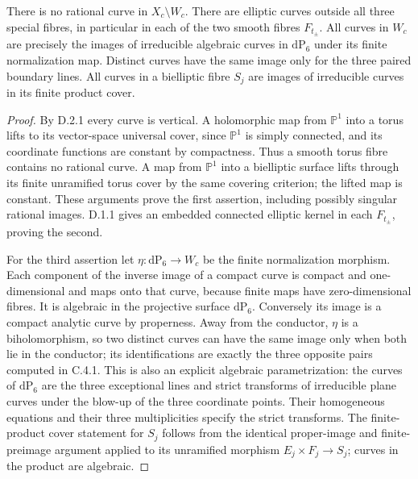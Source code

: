 \begin{proposition}\label{fam:src:D.2.2}\label{fam:st:D.2.2}
There is no rational curve in \(X_c\setminus W_c\). There are elliptic
curves outside all three special fibres, in particular in each of the
two smooth fibres \(F_{t_\pm}\). All curves in \(W_c\) are precisely the
images of irreducible algebraic curves in \(\mathrm{dP}_6\) under its
finite normalization map. Distinct curves have the same image only for
the three paired boundary lines. All curves in a bielliptic fibre
\(S_j\) are images of irreducible curves in its finite product cover.
\end{proposition}
\begin{proof}
By D.2.1 every curve is vertical. A holomorphic map from
\(\mathbb P^1\) into a torus lifts to its vector-space universal cover,
since \(\mathbb P^1\) is simply connected, and its coordinate functions
are constant by compactness. Thus a smooth torus fibre contains no
rational curve. A map from \(\mathbb P^1\) into a bielliptic surface
lifts through its finite unramified torus cover by the same covering
criterion; the lifted map is constant. These arguments prove the first
assertion, including possibly singular rational images.
D.1.1 gives an embedded connected elliptic kernel in each \(F_{t_\pm}\),
proving the second.

For the third assertion let \(\eta:\mathrm{dP}_6\to W_c\) be the finite
normalization morphism. Each component of the inverse image of a compact
curve is compact and one-dimensional and maps onto that curve, because
finite maps have zero-dimensional fibres. It is algebraic in the
projective surface \(\mathrm{dP}_6\). Conversely its image is a compact
analytic curve by properness. Away from the conductor, \(\eta\) is a
biholomorphism, so two distinct curves can have the same image only when
both lie in the conductor; its identifications are exactly the three
opposite pairs computed in C.4.1. This is also an explicit algebraic
parametrization: the curves of \(\mathrm{dP}_6\) are the three exceptional
lines and strict transforms of irreducible plane curves under the blow-up
of the three coordinate points. Their homogeneous equations and their
three multiplicities specify the strict transforms. The finite-product
cover statement for \(S_j\) follows from the identical proper-image and
finite-preimage argument applied to its unramified morphism
\(E_j\times F_j\to S_j\); curves in the product are algebraic.
\end{proof}

